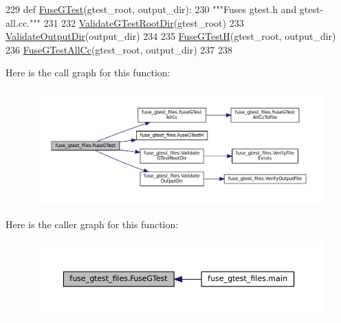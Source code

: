 \begin{DoxyCode}
229 \textcolor{keyword}{def }\hyperlink{namespacefuse__gtest__files_a4e7007ceec3a7a25617eac3342563ed6}{FuseGTest}(gtest\_root, output\_dir):
230   \textcolor{stringliteral}{"""Fuses gtest.h and gtest-all.cc."""}
231 
232   \hyperlink{namespacefuse__gtest__files_aa53690cd3c4ff01cfeea470f363f1dec}{ValidateGTestRootDir}(gtest\_root)
233   \hyperlink{namespacefuse__gtest__files_a9f584226b1f996ffff820e0751dbd458}{ValidateOutputDir}(output\_dir)
234 
235   \hyperlink{namespacefuse__gtest__files_a95685ab66129ced9d7b3db78e6001c8b}{FuseGTestH}(gtest\_root, output\_dir)
236   \hyperlink{namespacefuse__gtest__files_a9bcdfab09f297e2b2097d9cdde5ee092}{FuseGTestAllCc}(gtest\_root, output\_dir)
237 
238 
\end{DoxyCode}
Here is the call graph for this function\+:
\nopagebreak
\begin{figure}[H]
\begin{center}
\leavevmode
\includegraphics[width=350pt]{namespacefuse__gtest__files_a4e7007ceec3a7a25617eac3342563ed6_cgraph}
\end{center}
\end{figure}
Here is the caller graph for this function\+:
\nopagebreak
\begin{figure}[H]
\begin{center}
\leavevmode
\includegraphics[width=350pt]{namespacefuse__gtest__files_a4e7007ceec3a7a25617eac3342563ed6_icgraph}
\end{center}
\end{figure}
\mbox{\label{namespacefuse__gtest__files_a9bcdfab09f297e2b2097d9cdde5ee092}} 
